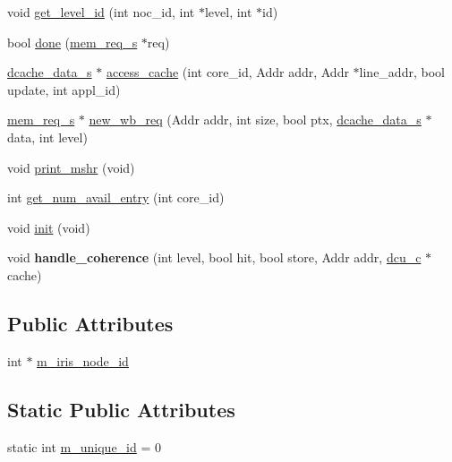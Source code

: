 \begin{DoxyCompactItemize}
\item 
void \hyperlink{classmemory__c_a37f7bb4a39885372fec26efa24927af9}{get\_\-level\_\-id} (int noc\_\-id, int $\ast$level, int $\ast$id)
\item 
bool \hyperlink{classmemory__c_ab0e78e319360a553d3e9864136176ccb}{done} (\hyperlink{structmem__req__s}{mem\_\-req\_\-s} $\ast$req)
\item 
\hyperlink{structdcache__data__s}{dcache\_\-data\_\-s} $\ast$ \hyperlink{classmemory__c_af3cabc34471d4d2af230f86f19799d0d}{access\_\-cache} (int core\_\-id, Addr addr, Addr $\ast$line\_\-addr, bool update, int appl\_\-id)
\item 
\hyperlink{structmem__req__s}{mem\_\-req\_\-s} $\ast$ \hyperlink{classmemory__c_a1fe0c501966e1ce43d8fdf6453031c37}{new\_\-wb\_\-req} (Addr addr, int size, bool ptx, \hyperlink{structdcache__data__s}{dcache\_\-data\_\-s} $\ast$data, int level)
\item 
void \hyperlink{classmemory__c_afbfb221d9819b83cc2807b7e539787f6}{print\_\-mshr} (void)
\item 
int \hyperlink{classmemory__c_a5d51af45787095c6453feb810302fd10}{get\_\-num\_\-avail\_\-entry} (int core\_\-id)
\item 
void \hyperlink{classmemory__c_ac244e4897309b864afa535d39e0b61a9}{init} (void)
\item 
\hypertarget{classmemory__c_aea2bbd7d03efed00e880ea6660487964}{
void {\bfseries handle\_\-coherence} (int level, bool hit, bool store, Addr addr, \hyperlink{classdcu__c}{dcu\_\-c} $\ast$cache)}
\label{classmemory__c_aea2bbd7d03efed00e880ea6660487964}

\end{DoxyCompactItemize}
\subsection*{Public Attributes}
\begin{DoxyCompactItemize}
\item 
int $\ast$ \hyperlink{classmemory__c_ad2743072864011245a46ee7038df5ae8}{m\_\-iris\_\-node\_\-id}
\end{DoxyCompactItemize}
\subsection*{Static Public Attributes}
\begin{DoxyCompactItemize}
\item 
static int \hyperlink{classmemory__c_a69b0fb5c2a19b6a196e86d1842a8a8a8}{m\_\-unique\_\-id} = 0
\end{DoxyCompactItemize}
